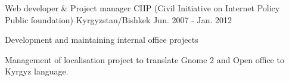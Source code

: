 \begin{cventries}
{\begin{cvitems}
      \end{cvitems}
    }
  \cventry
    {Web developer \& Project manager}
    {CIIP (Civil Initiative on Internet Policy Public foundation)}
    {Kyrgyzstan/Bishkek}
    {Jun. 2007 - Jan. 2012}
    {
      \begin{cvitems}
        \item {Development and maintaining internal office projects}
        \item {Management of localisation project to translate Gnome 2 and Open office to Kyrgyz language.}
      \end{cvitems}
    }
\end{cventries}
